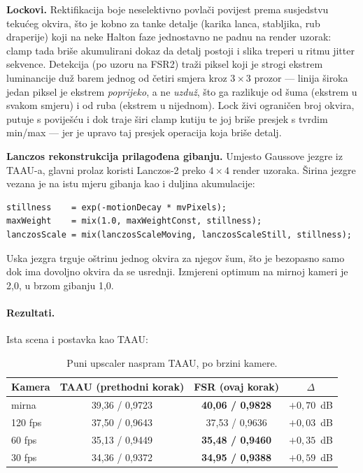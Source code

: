 \documentclass{mathos}
\begin{document}
\textbf{Lockovi.} Rektifikacija boje neselektivno povlači povijest prema
susjedstvu tekućeg okvira, što je kobno za tanke detalje (karika lanca,
stabljika, rub draperije) koji na neke Halton faze jednostavno ne padnu na
render uzorak: clamp tada briše akumulirani dokaz da detalj postoji i slika
treperi u ritmu jitter sekvence. Detekcija (po uzoru na FSR2) traži piksel
koji je strogi ekstrem luminancije duž barem jednog od četiri smjera kroz
$3\times3$ prozor — linija široka jedan piksel je ekstrem \emph{poprijeko}, a
ne \emph{uzduž}, što ga razlikuje od šuma (ekstrem u svakom smjeru) i od
ruba (ekstrem u nijednom). Lock živi ograničen broj okvira, putuje s
poviješću i dok traje širi clamp kutiju te joj briše presjek s tvrdim
min/max — jer je upravo taj presjek operacija koja briše detalj.

\textbf{Lanczos rekonstrukcija prilagođena gibanju.} Umjesto Gaussove jezgre
iz TAAU-a, glavni prolaz koristi Lanczos-2 preko $4\times4$ render uzoraka.
Širina jezgre vezana je na istu mjeru gibanja kao i duljina akumulacije:
\begin{verbatim}
stillness    = exp(-motionDecay * mvPixels);
maxWeight    = mix(1.0, maxWeightConst, stillness);
lanczosScale = mix(lanczosScaleMoving, lanczosScaleStill, stillness);
\end{verbatim}
Uska jezgra trguje oštrinu jednog okvira za njegov šum, što je bezopasno
samo dok ima dovoljno okvira da se usrednji. Izmjereni optimum na mirnoj
kameri je 2,0, u brzom gibanju 1,0.

\paragraph{Rezultati.} Ista scena i postavka kao TAAU:

\begin{table}[hbtp]
\centering
\begin{tabular}{|l|c|c|c|}\hline
Kamera & TAAU (prethodni korak) & FSR (ovaj korak) & $\Delta$ \\\hline
mirna & 39,36 / 0,9723 & \textbf{40,06 / 0,9828} & $+0,70$~dB \\\hline
120 fps & 37,50 / 0,9643 & 37,53 / 0,9636 & $+0,03$~dB \\\hline
60 fps & 35,13 / 0,9449 & \textbf{35,48 / 0,9460} & $+0,35$~dB \\\hline
30 fps & 34,36 / 0,9372 & \textbf{34,95 / 0,9388} & $+0,59$~dB \\\hline
\end{tabular}
\caption{Puni upscaler naspram TAAU, po brzini kamere.}
\label{table_m5_rezultati}
\end{table}
\end{document}
